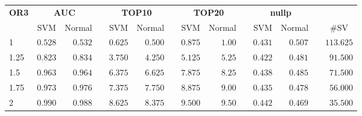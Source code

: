 \documentclass{article}\usepackage[]{graphicx}\usepackage[]{color}
\begin{document}
%
\begin{table}[!tbp]
\begin{center}
\begin{tabular}{lrrcrrcrrcrrcr}
\hline\hline
\multicolumn{1}{l}{\bfseries OR3}&\multicolumn{2}{c}{\bfseries AUC}&\multicolumn{1}{c}{\bfseries }&\multicolumn{2}{c}{\bfseries TOP10}&\multicolumn{1}{c}{\bfseries }&\multicolumn{2}{c}{\bfseries TOP20}&\multicolumn{1}{c}{\bfseries }&\multicolumn{2}{c}{\bfseries nullp}&\multicolumn{1}{c}{\bfseries }&\multicolumn{1}{c}{\bfseries }\tabularnewline
\cline{2-3} \cline{5-6} \cline{8-9} \cline{11-12}
\multicolumn{1}{l}{}&\multicolumn{1}{c}{SVM}&\multicolumn{1}{c}{Normal}&\multicolumn{1}{c}{}&\multicolumn{1}{c}{SVM}&\multicolumn{1}{c}{Normal}&\multicolumn{1}{c}{}&\multicolumn{1}{c}{SVM}&\multicolumn{1}{c}{Normal}&\multicolumn{1}{c}{}&\multicolumn{1}{c}{SVM}&\multicolumn{1}{c}{Normal}&\multicolumn{1}{c}{}&\multicolumn{1}{c}{\#SV}\tabularnewline
\hline
1&$0.528$&$0.532$&&$0.625$&$0.500$&&$0.875$&$1.00$&&$0.431$&$0.507$&&$113.625$\tabularnewline
1.25&$0.823$&$0.834$&&$3.750$&$4.250$&&$5.125$&$5.25$&&$0.422$&$0.481$&&$ 91.500$\tabularnewline
1.5&$0.963$&$0.964$&&$6.375$&$6.625$&&$7.875$&$8.25$&&$0.438$&$0.485$&&$ 71.500$\tabularnewline
1.75&$0.973$&$0.976$&&$7.375$&$7.750$&&$8.875$&$9.00$&&$0.435$&$0.478$&&$ 56.000$\tabularnewline
2&$0.990$&$0.988$&&$8.625$&$8.375$&&$9.500$&$9.50$&&$0.442$&$0.469$&&$ 35.500$\tabularnewline
\hline
\end{tabular}
\end{center}
\end{table}
\end{document}
